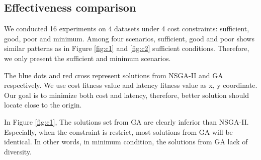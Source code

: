 \documentclass{llncs}
\begin{document}
\subsection{Effectiveness comparison}
\label{sec:comparison}
We conducted 16 experiments on 4 datasets under 4 cost constraints: sufficient, good, poor and minimum. 
Among four scenarios, sufficient, good and poor shows similar patterns as in Figure \ref{fig:c1} and \ref{fig:c2} sufficient conditions. 
Therefore, we only present the sufficient and minimum scenarios.

The blue dots and red cross represent solutions from NSGA-II and GA respectively. We use cost fitness value and latency fitness value as 
x, y coordinate. Our goal is to minimize both cost and latency, therefore, better solution should locate close to the origin.

In Figure \ref{fig:c1}, 
The solutions set from GA are clearly inferior than 
NSGA-II. Especially, when the constraint is restrict, most solutions from GA will be identical. In other words, in minimum condition, the solutions
from GA lack of diversity.
\end{document}
